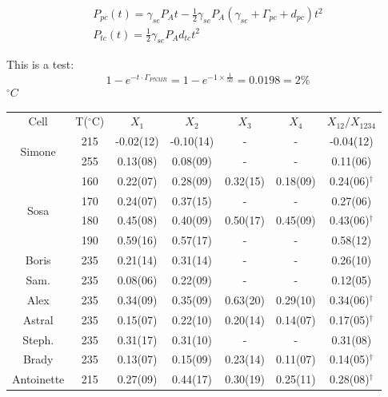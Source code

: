 \documentclass[pdftex,letterpaper,12pt]{report}
\begin{document}
	
\begin{subequations}\label{InitialSpinup}
	\begin{gather}
	P_{pc}(t)=\gamma_{se}P_{A}t-\frac{1}{2}\gamma_{se}P_{A}(\gamma_{se}+\Gamma_{pc}+d_{pc})t^{2}\\
	P_{tc}(t)=\frac{1}{2}\gamma_{se}P_{A}d_{tc}t^{2}
	\end{gather}
\end{subequations}

This is a test:
\begin{equation}
1-e^{-t\cdot \Gamma_{PNMR}} = 1-e^{-1\times \frac{1}{50}} =0.0198=2\%
\end{equation}
$^{\circ}C$

\begin{table}\scriptsize
	\captionsetup{font=scriptsize}
	\begin{center}
		\def\arraystretch{0.75}
		\setlength\tabcolsep{1pt}
		\begin{tabular}{|c|c|cccc|c|}
			\hline
			Cell & T($^\circ$C) & $X_1$ & $X_2$ & $X_3$ & $X_4$ & $X_{12}/X_{1234}$\\ 
			\multirow{2}{*}{Simone} & 215 & -0.02(12) & -0.10(14) & - & - & -0.04(12) \\
			& 255 & 0.13(08) & 0.08(09) & - & - & 0.11(06) \\
			\hline
			\multirow{4}{*}{Sosa} & 160 & 0.22(07) & 0.28(09) & 0.32(15) & 0.18(09) & 0.24(06)$^\dagger$ \\
			& 170 & 0.24(07) & 0.37(15) & - & - & 0.27(06)\\
			& 180 & 0.45(08) & 0.40(09) & 0.50(17) & 0.45(09) & 0.43(06)$^\dagger$ \\
			& 190 & 0.59(16) & 0.57(17) & - & - & 0.58(12) \\
			\hline
			\hline
			Boris & 235 & 0.21(14) & 0.31(14) & - & - & 0.26(10)\\
			\hline
			Sam. & 235 & 0.08(06) & 0.22(09) & - & - & 0.12(05) \\
			\hline
			Alex & 235 & 0.34(09) & 0.35(09) & 0.63(20) & 0.29(10) & 0.34(06)$^\dagger$\\
			\hline
			Astral & 235 & 0.15(07) & 0.22(10) & 0.20(14) & 0.14(07) & 0.17(05)$^\dagger$\\
			\hline
			Steph. & 235 & 0.31(17) & 0.31(10) & - & - & 0.31(08)\\
			\hline
			Brady & 235 & 0.13(07) & 0.15(09) & 0.23(14) & 0.11(07) & 0.14(05)$^\dagger$\\
			\hline
			\multirow{3}{*}{Antoinette} & 215 & 0.27(09) & 0.44(17) & 0.30(19) & 0.25(11) & 0.28(08)$^\dagger$\\

\end{tabular}
\end{center}
\end{table}
\end{document}
